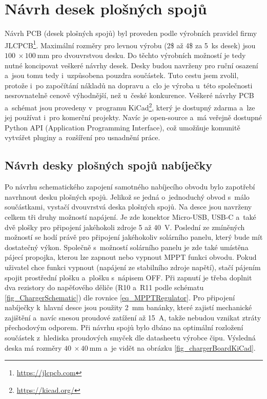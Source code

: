 \chapter{Návrh desek plošných spojů}

Návrh PCB (desek plošných spojů) byl proveden podle výrobních pravidel firmy JLCPCB\footnote{\url{https://jlcpcb.com}}. Maximální rozměry pro levnou výrobu (2\$ až 4\$ za 5~ks desek) jsou $\SI{100}{}\times \SI{100}{\milli\metre}$ pro dvouvrstvou desku. Do těchto výrobních možností je tedy nutné koncipovat veškeré návrhy desek. Desky budou navrženy pro ruční osazení a~jsou tomu tedy i~uzpůsobena pouzdra součástek. Tuto cestu jsem zvolil, protože i~po započítání nákladů na dopravu a~clo je výroba u~této společnosti nesrovnatelně cenově výhodnější, než u~české konkurence. Veškeré návrhy PCB a~schémat jsou provedeny v~programu KiCad\footnote{\url{https://kicad.org/}}, který je dostupný zdarma a~lze jej používat i~pro komerční projekty. Navíc je open-source a~má veřejně dostupné Python API (Application Programming Interface), což umožňuje komunitě vytvářet pluginy a~rozšíření pro usnadnění práce.

\section{Návrh desky plošných spojů nabíječky}

Po návrhu schematického zapojení samotného nabíjecího obvodu bylo zapotřebí navrhnout desku plošných spojů. Jelikož se jedná o~jednoduchý obvod s~málo součástkami, vystačí dvouvrstvá deska plošných spojů. Na desce jsou navrženy celkem tři druhy možností napájení. Je zde konektor Micro-USB, USB-C a~také dvě plošky pro připojení jakéhokoli zdroje \SI{5}{} až \SI{40}{\volt}. Poslední ze zmíněných možností se hodí právě pro připojení jakéhokoliv solárního panelu, který bude mít dostatečný výkon. Společně s~možností solárního panelu je zde také umístěna pájecí propojka, kterou lze zapnout nebo vypnout MPPT funkci obvodu. Pokud uživatel chce funkci vypnout (napájení ze stabilního zdroje napětí), stačí pájením spojit prostřední plošku a~plošku s~nápisem OFF. Při zapnutí je třeba doplnit dva rezistory do napěťového děliče (R10 a~R11 podle schématu \ref{fig_ChargerSchematic}) dle rovnice \ref{eq_MPPTRegulator}. Pro připojení nabíječky k~hlavní desce jsou použity \SI{2}{\milli\metre} banánky, které zajistí mechanické zajištění a~navíc snesou proudové zatížení až \SI{15}{\ampere}, takže nebudou vznikat ztráty přechodovým odporem. Při návrhu spojů bylo dbáno na optimální rozložení součástek z~hlediska proudových smyček dle datasheetu výrobce čipu. Výsledná deska má rozměry $\SI{40}{}\times \SI{40}{\milli\metre}$ a~je vidět na obrázku \ref{fig_chargerBoardKiCad}.

